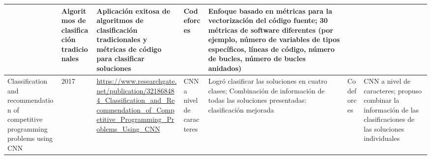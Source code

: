 \documentclass{article}
\begin{document}
\begin{itemize}
\begin{longtable}{|p{2cm}|p{0.8cm}|p{2cm}|p{2cm}|p{3cm}|p{2cm}|p{3cm}|}
              
                             & Algoritmos de clasificación tradicionales
                             & Aplicación exitosa de algoritmos de clasificación tradicionales y métricas de código para clasificar soluciones
                             & Codeforces 
                             & Enfoque basado en métricas para la vectorización del código fuente; 30 métricas de software diferentes (por ejemplo, número de variables de tipos específicos, líneas de código, número de bucles, número de bucles anidados)                                                                                                                                                                                                                \\
              
              \hline
              Classification and recommendation of competitive programming problems
              using CNN
                             & 2017
                             & \href{https://www.researchgate.net/publication/321868484_Classification_and_Recommendation_of_Competitive_Programming_Problems_Using_CNN}{\url{https://www.researchgate.net/publication/321868484_Classification_and_Recommendation_of_Competitive_Programming_Problems_Using_CNN}}

              
              
              
              
              
                             & CNN a nivel de caracteres
                             & Logró clasificar las soluciones en cuatro clases; Combinación de información de todas las soluciones presentadas: clasificación mejorada 
                             & Codeforces 
                             & CNN a nivel de caracteres; propuso combinar la información de las clasificaciones de las soluciones individuales                                                                                                                                                                                                                                                                                                       \\
              
              \hline
              
          \end{longtable}
          
          
\end{itemize}
\end{document}
